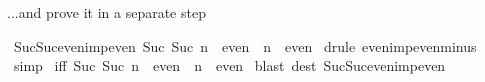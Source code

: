 \begin{isabellebody}
\begin{isamarkuptext}
...and prove it in a separate step%
\end{isamarkuptext}%
\ Suc{\isacharunderscore}Suc{\isacharunderscore}even{\isacharunderscore}imp{\isacharunderscore}even{\isacharcolon}\ {\isachardoublequote}Suc\ {\isacharparenleft}Suc\ n{\isacharparenright}\ {\isasymin}\ even\ {\isasymLongrightarrow}\ n\ {\isasymin}\ even{\isachardoublequote}\isanewline
{}\ {\isacharparenleft}drule\ even{\isacharunderscore}imp{\isacharunderscore}even{\isacharunderscore}minus{\isacharunderscore}{}{\isacharparenright}\isanewline
{}\ simp\isanewline
{}\isanewline
\isanewline
{}\ {\isacharbrackleft}iff{\isacharbrackright}{\isacharcolon}\ {\isachardoublequote}{\isacharparenleft}{\isacharparenleft}Suc\ {\isacharparenleft}Suc\ n{\isacharparenright}{\isacharparenright}\ {\isasymin}\ even{\isacharparenright}\ {\isacharequal}\ {\isacharparenleft}n\ {\isasymin}\ even{\isacharparenright}{\isachardoublequote}\isanewline
{}\ {\isacharparenleft}blast\ dest{\isacharcolon}\ Suc{\isacharunderscore}Suc{\isacharunderscore}even{\isacharunderscore}imp{\isacharunderscore}even{\isacharparenright}\isanewline
{}\isanewline
\isanewline
{}\isanewline
\isanewline
\end{isabellebody}%
